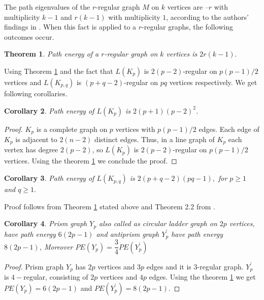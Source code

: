 \documentclass{article}
\newtheorem{theorem}{Theorem}[section]
\newtheorem{corollary}[theorem] {Corollary}
\newtheorem*{open problem*}{Open Problem}
\begin{document}
	The path eigenvalues of the $r$-regular graph $M$ on $k$ vertices are $–r$ with multiplicity $k-1$ and $r(k-1)$ with multiplicity $1$, according to the authors' findings in  \cite{cn}. When this fact is applied to a $r$-regular graphs, the following outcomes occur.  
	\begin{theorem}\label{pek}
		Path energy of a $r$-regular graph on $k$ vertices is $2r(k-1).$     
	\end{theorem}
	Using Theorem \ref{pek} and the fact that $L(K_p)$ is  $2(p-2)$-regular on $p(p-1)/2$ vertices and $L(K_{p,q})$ is $(p+q-2)$-regular on $pq$ vertices respectively. We get following corollaries.  
	\begin{corollary}\label{pel}
		Path energy of $L(K_p)$ is $2(p+1)(p-2)^2$.
	\end{corollary}
	\begin{proof}
		$K_p$ is a complete graph on $p$ vertices with $p(p-1)/2$ edges. Each edge of $K_p$ is adjacent to $2(n-2)$ distinct edges. Thus, in a line graph of $K_p$ each vertex has degree $2(p-2)$, so $L(K_p)$ is $2(p-2)$-regular on $p(p-1)/2$ vertices. Using the theorem \ref{pek} we conclude the proof.
	\end{proof}
	\begin{corollary}
		Path energy of $L(K_{p,q})$ is $2(p+q-2)(pq-1),$ for $p \geq 1$ and $q \geq 1.$
	\end{corollary}
	Proof follows from Theorem \ref{pek} stated above and Theorem 2.2 from \cite{kbg}.
	\begin{corollary}
		Prism graph $Y_p$ also called as circular ladder graph on $2p$ vertices, have path energy $6(2p-1)$ and antiprism graph $Y^{'}_{p}$ have path energy $8(2p-1)$, Moreover $PE(Y_p)=\dfrac{3}{4} PE(Y^{'}_{p})$
	\end{corollary}
	\begin{proof}
		Prism graph $Y_p$ has $2p$ vertices and $3p$ edges and it is $3$-regular graph. $Y^{'}_{p}$ is $4-$regular, consisting of $2p$ vertices and $4p$ edges. Using the theorem \ref{pek} we get $PE(Y_p)=6(2p-1)$ and $PE(Y^{'}_{p})=8(2p-1).$
	\end{proof}
	
\end{document}
